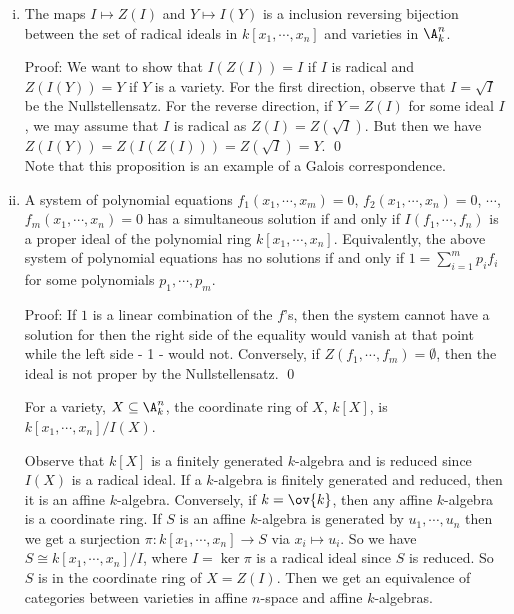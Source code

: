 \begin{enumerate}[(i)]

\item

\begin{prop}
The maps $I \mapsto Z(I)$ and $Y \mapsto I(Y)$ is a inclusion reversing bijection between the set of radical ideals in $k[x_1,\cdots,x_n]$ and varieties in $\A_k^n$. 
\end{prop}

\noindent Proof: We want to show that $I(Z(I))=I$ if $I$ is radical and $Z(I(Y))=Y$ if $Y$ is a variety. For the first direction, observe that $I=\sqrt{I}$ be the Nullstellensatz. For the reverse direction, if $Y=Z(I)$ for some ideal $I$, we may assume that $I$ is radical as $Z(I)=Z(\sqrt{I})$. But then we have $Z(I(Y))=Z(I(Z(I)))=Z(\sqrt{I})=Y$. \qed \\

Note that this proposition is an example of a Galois correspondence. 

\item

\begin{prop}
A system of polynomial equations $f_1(x_1,\cdots,x_m)=0$, $f_2(x_1,\cdots,x_n)=0$, $\cdots$, $f_m(x_1,\cdots,x_n)=0$ has a simultaneous solution if and only if $I(f_1,\cdots,f_n)$ is a proper ideal of the polynomial ring $k[x_1,\cdots,x_n]$. Equivalently, the above system of polynomial equations has no solutions if and only if $1=\sum_{i=1}^m p_if_i$ for some polynomials $p_1,\cdots,p_m$. 
\end{prop}

\noindent Proof: If $1$ is a linear combination of the $f$'s, then the system cannot have a solution for then the right side of the equality would vanish at that point while the left side - 1 - would not. Conversely, if $Z(f_1,\cdots,f_m)= \emptyset$, then the ideal is not proper by the Nullstellensatz. \qed \\

\begin{dfn}
For a variety, $X \subseteq \A_k^n$, the coordinate ring of $X$, $k[X]$, is $k[x_1,\cdots,x_n]/I(X)$.
\end{dfn}

Observe that $k[X]$ is a finitely generated $k$-algebra and is reduced since $I(X)$ is a radical ideal. If a $k$-algebra is finitely generated and reduced, then it is an affine $k$-algebra. Conversely, if $k=\ov{k}$, then any affine $k$-algebra is a coordinate ring. If $S$ is an affine $k$-algebra is generated by $u_1,\cdots,u_n$ then we get a surjection $\pi: k[x_1,\cdots,x_n] \to S$ via $x_i \mapsto u_i$. So we have $S \cong k[x_1,\cdots,x_n]/I$, where $I=\ker \pi$ is a radical ideal since $S$ is reduced. So $S$ is in the coordinate ring of $X=Z(I)$. Then we get an equivalence of categories between varieties in affine $n$-space and affine $k$-algebras. 


\end{enumerate}
